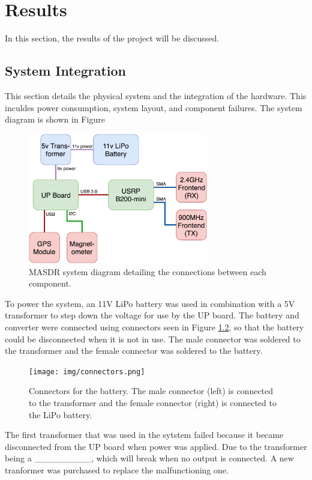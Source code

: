 \chapter{Results}
In this section, the results of the project will be discussed.

\section{System Integration}
This section details the physical system and the integration of the hardware. This inculdes power consumption, system layout, and component failures. The system diagram is shown in Figure \cite{masdr_system_diagram} \par
\begin{figure}[ht!]
	\centering
	\includegraphics[width=0.70\textwidth]{img/masdr_system_diagram.png}
	\caption{MASDR system diagram detailing the connections between each component.}
	\label{fig:masdr_system_diagram}
\end{figure}\par
To power the system, an 11V LiPo battery was used in combination with a 5V transformer to step down the voltage for use by the UP board. The battery and converter were connected using connectors seen in Figure \ref{fig:connectors}, so that the battery could be disconnected when it is not in use. The male connector was soldered to the transformer and the female connector was soldered to the battery.
\begin{figure}[ht!]
	\centering
	\texttt{[image: img/connectors.png]}
	\caption{Connectors for the battery. The male connector (left) is connected to the transformer and the female connector (right) is connected to the LiPo battery.}
	\label{fig:connectors}
\end{figure}\par
The first transformer that was used in the sytstem failed because it became disconnected from the UP board when power was applied. Due to the transformer being a _________, which will break when no output is connected. A new tranformer was purchased to replace the malfunctioning one. \par

